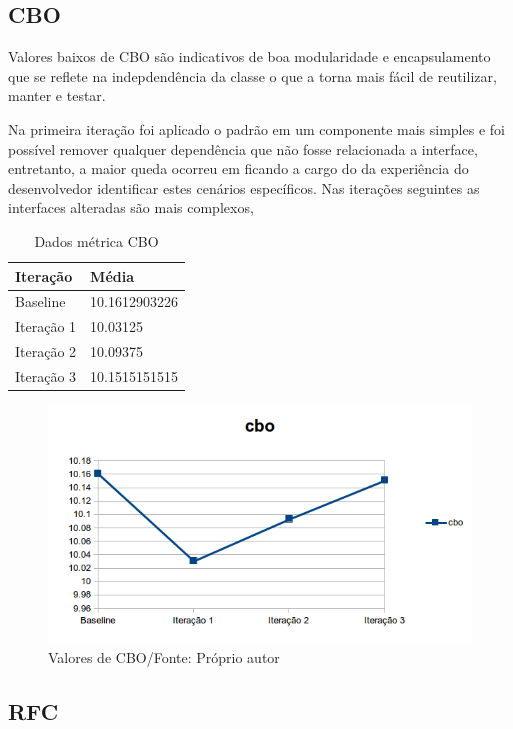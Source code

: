 \subsection{CBO}

Valores baixos de CBO são indicativos de boa modularidade e encapsulamento que
se reflete na indepdendência da classe o que a torna mais fácil de reutilizar,
manter e testar.

Na primeira iteração foi aplicado o padrão em um componente mais simples e foi
possível remover qualquer dependência que não fosse relacionada a interface,
entretanto, a maior queda ocorreu em  ficando a cargo do da experiência do
desenvolvedor identificar estes cenários específicos. Nas iterações seguintes as
interfaces alteradas são mais complexos,

\begin{table}[h]
	\centering
    \begin{tabular}{ | l | l | }
    \hline
    Iteração & Média 			\\ \hline
    Baseline & 10.1612903226   	\\ \hline
    Iteração 1 & 10.03125		\\ \hline
	Iteração 2 & 10.09375		\\ \hline
	Iteração 3 & 10.1515151515	\\ \hline
    \end{tabular}
    \caption{Dados métrica CBO}
    \label{tab:cbo}
\end{table}

\begin{figure}[h]
	\centering
	\includegraphics{img/cbo.png}
	\caption{Valores de CBO/Fonte: Próprio autor}
	\label{fig:cbo}
\end{figure}


\subsection{RFC}

